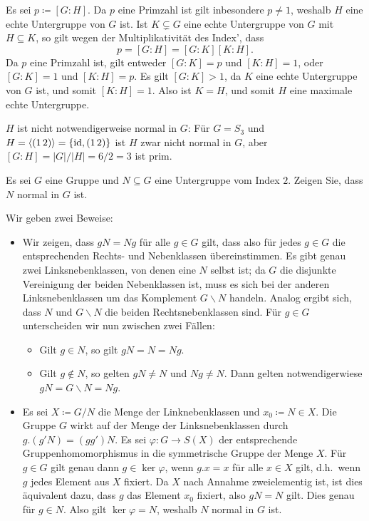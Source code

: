 \begin{solution}
  Es sei $p \coloneqq [G : H]$.
  Da $p$ eine Primzahl ist gilt inbesondere $p \neq 1$, weshalb $H$ eine echte Untergruppe von $G$ ist.
  Ist $K \subsetneq G$ eine echte Untergruppe von $G$ mit $H \subseteq K$, so gilt wegen der Multiplikativität des Index’, dass 
  \[
      p
    = [G : H]
    = [G : K] [K : H].
  \]
  Da $p$ eine Primzahl ist, gilt entweder $[G : K] = p$ und $[K : H] = 1$, oder $[G : K] = 1$ und $[K : H] = p$.
  Es gilt $[G : K] > 1$, da $K$ eine echte Untergruppe von $G$ ist, und somit $[K : H] = 1$.
  Also ist $K = H$, und somit $H$ eine maximale echte Untergruppe.
  
  $H$ ist nicht notwendigerweise normal in $G$:
  Für $G = S_3$ und $H = \langle(1\,2)\rangle = \{\operatorname{id}, (1\,2)\}$ ist $H$ zwar nicht normal in $G$, aber $[G : H] = |G|/|H| = 6/2 = 3$ ist prim.
\end{solution}


\begin{question}[subtitle = Untergruppen von Index $2$]
  Es sei $G$ eine Gruppe und $N \subseteq G$ eine Untergruppe vom Index $2$.
  Zeigen Sie, dass $N$ normal in $G$ ist.
\end{question}


\begin{solution}
  Wir geben zwei Beweise:
  \begin{itemize}
    \item
      Wir zeigen, dass $gN = Ng$ für alle $g \in G$ gilt, dass also für jedes $g \in G$ die entsprechenden Rechts- und Nebenklassen übereinstimmen.
      Es gibt genau zwei Linksnebenklassen, von denen eine $N$ selbst ist;
      da $G$ die disjunkte Vereinigung der beiden Nebenklassen ist, muss es sich bei der anderen Linksnebenklassen um das Komplement $G \smallsetminus N$ handeln.
      Analog ergibt sich, dass $N$ und $G \smallsetminus N$ die beiden Rechtsnebenklassen sind.
      Für $g \in G$ unterscheiden wir nun zwischen zwei Fällen:
      \begin{itemize}
        \item
          Gilt $g \in N$, so gilt $gN = N = Ng$.
        \item
          Gilt $g \notin N$, so gelten $gN \neq N$ und $Ng \neq N$.
          Dann gelten notwendigerwiese $gN = G \smallsetminus N = Ng$.
      \end{itemize}
    \item
      Es sei $X \coloneqq G/N$ die Menge der Linknebenklassen und $x_0 \coloneqq N \in X$.
      Die Gruppe $G$ wirkt auf der Menge der Linksnebenklassen  durch $g.(g'N) = (gg')N$.
      Es sei $\varphi \colon G \to S(X)$ der entsprechende Gruppenhomomorphismus in die symmetrische Gruppe der Menge $X$.
      Für $g \in G$ gilt genau dann $g \in \ker \varphi$, wenn $g.x = x$ für alle $x \in X$ gilt, d.h.\ wenn $g$ jedes Element aus $X$ fixiert.
      Da $X$ nach Annahme zweielementig ist, ist dies äquivalent dazu, dass $g$ das Element $x_0$ fixiert, also $gN = N$ gilt.
      Dies genau für $g \in N$.
      Also gilt $\ker \varphi = N$, weshalb $N$ normal in $G$ ist.
  \end{itemize}
\end{solution}


